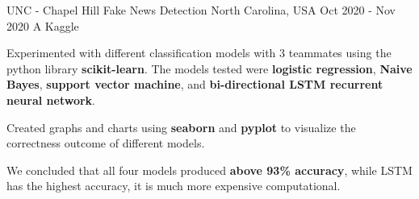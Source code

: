 \begin{cventries}
    \cventry
    {UNC - Chapel Hill} %
    {Fake News Detection} %
    {North Carolina, USA} %
    {Oct 2020 - Nov 2020} %
    {A Kaggle }
    {
      \begin{cvitems} %
        \item {Experimented with different classification models with 3 teammates using the python library \textbf{scikit-learn}. The models tested were \textbf{logistic regression}, \textbf{Naive Bayes}, \textbf{support vector machine}, and \textbf{bi-directional LSTM recurrent neural network}.}
        \item {Created graphs and charts using \textbf{seaborn} and \textbf{pyplot} to visualize the correctness outcome of different models.}
        \item {We concluded that all four models produced  \textbf{above 93\% accuracy}, while LSTM has the highest accuracy, it is much more expensive computational.}
      \end{cvitems}
    }

\end{cventries}
